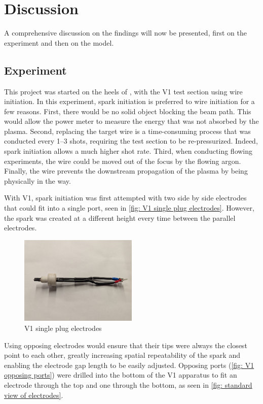 \chapter{Discussion}\label{chp:discussion}

A comprehensive discussion on the findings will now be presented, first on the experiment and then on the model.

\section{Experiment}
This project was started on the heels of \textcite{duplayArgonLaserPlasmaThruster2024a}, with the V1 test section using wire initiation. In this experiment, spark initiation is preferred to wire initiation for a few reasons. First, there would be no solid object blocking the beam path. This would allow the power meter to measure the energy that was not absorbed by the plasma. Second, replacing the target wire is a time-consuming process that was conducted every 1–3 shots, requiring the test section to be re-pressurized. Indeed, spark initiation allows a much higher shot rate. Third, when conducting flowing experiments, the wire could be moved out of the focus by the flowing argon. Finally, the wire prevents the downstream propagation of the plasma by being physically in the way.

With V1, spark initiation was first attempted with two side by side electrodes that could fit into a single port, seen in \autoref{fig: V1 single plug electrodes}. However, the spark was created at a different height every time between the parallel electrodes.

\begin{figure}[!ht]
    \centering
    \includegraphics[width=0.5\textwidth]{assets/5 discussion/V1 single plug electrode.jpg}
    \caption{V1 single plug electrodes}
    \label{fig: V1 single plug electrodes}
\end{figure}

Using opposing electrodes would ensure that their tips were always the closest point to each other, greatly increasing spatial repeatability of the spark and enabling the electrode gap length to be easily adjusted. Opposing ports (\autoref{fig: V1 opposing ports}) were drilled into the bottom of the V1 apparatus to fit an electrode through the top and one through the bottom, as seen in \autoref{fig: standard view of electrodes}.

